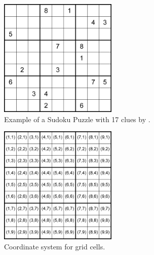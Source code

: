 \begin{figure}
\centering
\includegraphics[width=0.5\textwidth]{Figures/17-clue sudoku puzzle (McGuire).png}
\caption{Example of a Sudoku Puzzle with 17 clues by \citet{https://doi.org/10.48550/arxiv.1201.0749}.}
\label{fig:exampleSudoku}
\end{figure}

\begin{figure}
\centering
\includegraphics[width=0.5\textwidth]{Figures/GridCoordinates.png}
\caption{Coordinate system for grid cells.}
\label{fig:GridCoordinates}
\end{figure}


